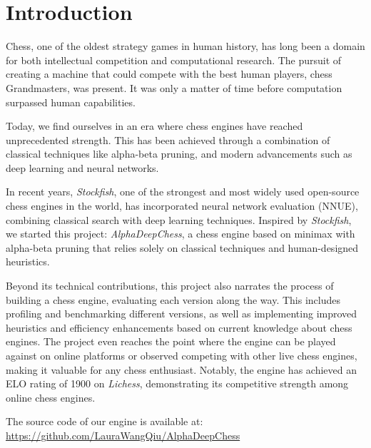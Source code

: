 \chapter{Introduction}\label{cap:introduction}
\renewcommand{\figurename}{Figure}

Chess, one of the oldest strategy games in human history, has long been a domain for both intellectual competition and computational research. The pursuit of creating a machine that could compete with the best human players, chess Grandmasters, was present. It was only a matter of time before computation surpassed human capabilities.

\vspace{1em}

\noindent Today, we find ourselves in an era where chess engines have reached unprecedented strength. This has been achieved through a combination of classical techniques like alpha-beta pruning, and modern advancements such as deep learning and neural networks.

\vspace{1em}

\noindent In recent years, \textit{Stockfish}, one of the strongest and most widely used open-source chess engines in the world, has incorporated neural network evaluation (NNUE), combining classical search with deep learning techniques. Inspired by \textit{Stockfish}, we started this project: \textit{AlphaDeepChess}, a chess engine based on minimax with alpha-beta pruning that relies solely on classical techniques and human-designed heuristics.

\vspace{1em}

\noindent Beyond its technical contributions, this project also narrates the process of building a chess engine, evaluating each version along the way. This includes profiling and benchmarking different versions, as well as implementing improved heuristics and efficiency enhancements based on current knowledge about chess engines. The project even reaches the point where the engine can be played against on online platforms or observed competing with other live chess engines, making it valuable for any chess enthusiast. Notably, the engine has achieved an ELO rating of 1900 on \textit{Lichess}, demonstrating its competitive strength among online chess engines.

\vspace{1em}

\noindent The source code of our engine is available at:\\
\url{https://github.com/LauraWangQiu/AlphaDeepChess}

